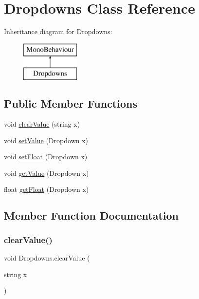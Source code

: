 \hypertarget{class_dropdowns}{}\section{Dropdowns Class Reference}
\label{class_dropdowns}
Inheritance diagram for Dropdowns\+:\begin{figure}[H]
\begin{center}
\leavevmode
\includegraphics[height=2.000000cm]{class_dropdowns}
\end{center}
\end{figure}
\subsection*{Public Member Functions}
\begin{DoxyCompactItemize}
\item 
void \hyperlink{class_dropdowns_a00f700cfa109e3f8d268c881c0301ae7}{clear\+Value} (string x)
\item 
void \hyperlink{class_dropdowns_a37bc66166091cc37bb3ff8aa1e6fb0d4}{set\+Value} (Dropdown x)
\item 
void \hyperlink{class_dropdowns_a41cceb5188d9f7e1b311c23b3a625c65}{set\+Float} (Dropdown x)
\item 
void \hyperlink{class_dropdowns_a670e65ca917ea1ed349524022d50e02a}{get\+Value} (Dropdown x)
\item 
float \hyperlink{class_dropdowns_abf1eed7ac478b707ce258d5a89160520}{get\+Float} (Dropdown x)
\end{DoxyCompactItemize}


\subsection{Member Function Documentation}
\mbox{\label{class_dropdowns_a00f700cfa109e3f8d268c881c0301ae7}} 
\subsubsection{\texorpdfstring{clear\+Value()}{clearValue()}}
{\footnotesize\ttfamily void Dropdowns.\+clear\+Value (\begin{DoxyParamCaption}\item[{string}]{x }\end{DoxyParamCaption})}

